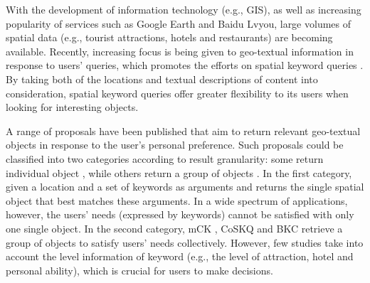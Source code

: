 With the development of information technology (e.g., GIS), as well as increasing popularity of services such as Google Earth and Baidu Lvyou, large volumes of spatial data (e.g., tourist attractions, hotels and restaurants) are becoming available. Recently, increasing focus is being given to geo-textual information in response to users' queries, which promotes the efforts on spatial keyword queries \cite{cong2012efficient, de2008keyword, wu2012joint, zhang2009keyword}. By taking both of the locations and textual descriptions of content into consideration, spatial keyword queries offer greater flexibility to its users when looking for interesting objects.



A range of proposals have been published that aim to return relevant geo-textual objects in response to the user's personal preference. Such proposals could be classified into two categories according to result granularity: some return individual object \cite{cong2009efficient, de2008keyword, cong2012efficient, shang2012user}, while others return a group of objects \cite{zhang2009keyword, zhang2010locating, cao2011collective, long2013collective, deng2015best}. In the first category, given a location and a set of keywords as arguments and returns the single spatial object that best matches these arguments. In a wide spectrum of applications, however, the users' needs (expressed by keywords) cannot be satisfied with only one single object. In the second category, mCK \cite{zhang2009keyword, zhang2010locating}, CoSKQ \cite{cao2011collective, long2013collective} and BKC \cite{deng2015best} retrieve a group of objects to satisfy users' needs collectively. However, few studies take into account the level information of keyword (e.g., the level of attraction, hotel and personal ability), which is crucial for users to make decisions.
